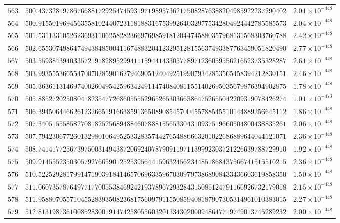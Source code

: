 \documentclass[12pt,reqno]{amsart}
\theoremstyle{remark}
\begin{document}
\begin{longtable}{clc}
$563$ & $500.4373281978676688172925474593197198957362175082876388204985922237290402$ & $2.01\times 10^{-448}$ \\
$564$ & $500.9155019694563558102440723118188316753992640329775342804924442785585573$ & $2.04\times 10^{-448}$ \\
$565$ & $501.5311331052623693110625828236697698591812044745880357968131568303760788$ & $2.42\times 10^{-448}$ \\
$566$ & $502.6553074986474943848500411674883204123295128155637493387763459051820490$ & $2.77\times 10^{-448}$ \\
$567$ & $503.5593843940335721918289529941115944143305778971236059556216523735328287$ & $2.61\times 10^{-448}$ \\
$568$ & $503.9935553665547007028590162794690512404925199079342853565458394212830151$ & $2.46\times 10^{-448}$ \\
$569$ & $505.3636113146974002604954259634249114740840811551402695035679876394902875$ & $1.78\times 10^{-448}$ \\
$570$ & $505.8852720250804182354772686055552965265303663864752655042209319078426274$ & $1.01\times 10^{-473}$ \\
$571$ & $506.3945064466261232665191663859136508908545700455788545510144889256645112$ & $1.86\times 10^{-448}$ \\
$572$ & $507.3405155585827081825256894884607888155653304310937519660504800438835261$ & $2.06\times 10^{-448}$ \\
$573$ & $507.7942306772601329801064952533283574427654886663201022686889644044121071$ & $2.36\times 10^{-448}$ \\
$574$ & $508.7414177256739750031494387206924078790911971139992303721226639788729910$ & $1.92\times 10^{-448}$ \\
$575$ & $509.9145552350305792766590125253956441596324562344851868437566741515510215$ & $2.36\times 10^{-448}$ \\
$576$ & $510.5225292817991471903918414657069633596703097973868908433436603619858350$ & $1.50\times 10^{-448}$ \\
$577$ & $511.0607357876497717700553846924219378967293284315085124791166926732179058$ & $2.15\times 10^{-448}$ \\
$578$ & $511.9588070557104552839350823681756097911550859408187907305314961010383015$ & $2.27\times 10^{-448}$ \\
$579$ & $512.8131987361008528300191474258055603201334302000948647719749013745289232$ & $2.00\times 10^{-448}$ \\

\end{longtable}
\end{document}
